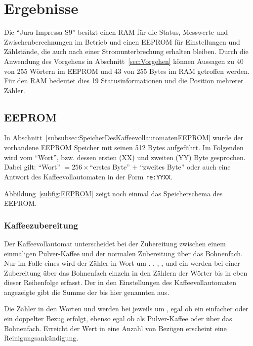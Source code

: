 \chapter{Ergebnisse}\label{ch:Ergebnisse} %
Die "`Jura Impressa S9"' besitzt einen \ac{RAM} für die Status, Messwerte und Zwischenberechnungen im Betrieb und einen \ac{EEPROM} für Einstellungen und Zählstände, die auch nach einer Stromunterbrechung erhalten bleiben.
Durch die Anwendung des Vorgehens in Abschnitt~\ref{sec:Vorgehen} können Aussagen zu 40 von 255 Wörtern im \ac{EEPROM} und 43 von 255 Bytes im \ac{RAM} getroffen werden.
Für den \ac{RAM} bedeutet dies 19 Statusinformationen und die Position mehrerer Zähler.

\section{EEPROM}
In Abschnitt~\ref{subsubsec:SpeicherDesKaffeevollautomatenEEPROM} wurde der vorhandene \acf{EEPROM} Speicher mit seinen 512 Bytes aufgeführt.
Im Folgenden wird vom "`Wort"', bzw. dessen ersten (XX) und zweiten (YY) Byte gesprochen.
Dabei gilt: "`Wort"' $= 256\times$"`erstes Byte"' $ + $ "`zweites Byte"' oder auch eine Antwort des Kaffeevollautomaten in der Form \texttt{re:YYXX}.

Abbildung~\ref{subfig:EEPROM} zeigt noch einmal das Speicherschema des \ac{EEPROM}.

\subsection{Kaffeezubereitung}\label{subsec:ErgebnisKaffeezubereitung}
Der Kaffeevollautomat unterscheidet bei der Zubereitung zwischen einem einmaligen Pulver-Kaffee und der normalen Zubereitung über das Bohnenfach.
Nur im Falle eines  wird der Zähler in Wort  um .
, , ,  und ein  werden bei einer Zubereitung über das Bohnenfach einzeln in den Zählern der Wörter  bis  in eben dieser Reihenfolge erfasst.
Der in den Einstellungen des Kaffeevollautomaten angezeigte  gibt die Summe der bis hier genannten  aus.

Die Zähler in den Worten  und  werden bei  jeweils um , egal ob ein einfacher oder ein doppelter Bezug erfolgt, ebenso egal ob als Pulver-Kaffee oder über das Bohnenfach.
Erreicht der Wert in  eine Anzahl von  Bezügen erscheint eine Reinigungsankündigung.

